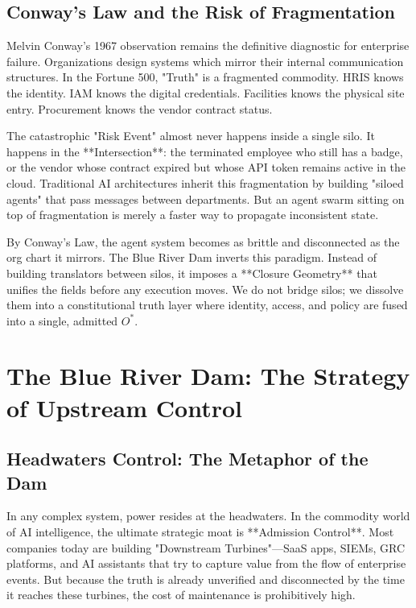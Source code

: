 \documentclass[12pt,a4paper,oneside]{book}
\begin{document}
\section{Conway’s Law and the Risk of Fragmentation}
Melvin Conway’s 1967 observation remains the definitive diagnostic for enterprise failure. Organizations design systems which mirror their internal communication structures. In the Fortune 500, "Truth" is a fragmented commodity. HRIS knows the identity. IAM knows the digital credentials. Facilities knows the physical site entry. Procurement knows the vendor contract status. 

The catastrophic "Risk Event" almost never happens inside a single silo. It happens in the **Intersection**: the terminated employee who still has a badge, or the vendor whose contract expired but whose API token remains active in the cloud. Traditional AI architectures inherit this fragmentation by building "siloed agents" that pass messages between departments. But an agent swarm sitting on top of fragmentation is merely a faster way to propagate inconsistent state. 

By Conway’s Law, the agent system becomes as brittle and disconnected as the org chart it mirrors. The Blue River Dam inverts this paradigm. Instead of building translators between silos, it imposes a **Closure Geometry** that unifies the fields before any execution moves. We do not bridge silos; we dissolve them into a constitutional truth layer where identity, access, and policy are fused into a single, admitted $O^*$.

\chapter{The Blue River Dam: The Strategy of Upstream Control}

\section{Headwaters Control: The Metaphor of the Dam}
In any complex system, power resides at the headwaters. In the commodity world of AI intelligence, the ultimate strategic moat is **Admission Control**. Most companies today are building "Downstream Turbines"---SaaS apps, SIEMs, GRC platforms, and AI assistants that try to capture value from the flow of enterprise events. But because the truth is already unverified and disconnected by the time it reaches these turbines, the cost of maintenance is prohibitively high.
\end{document}
